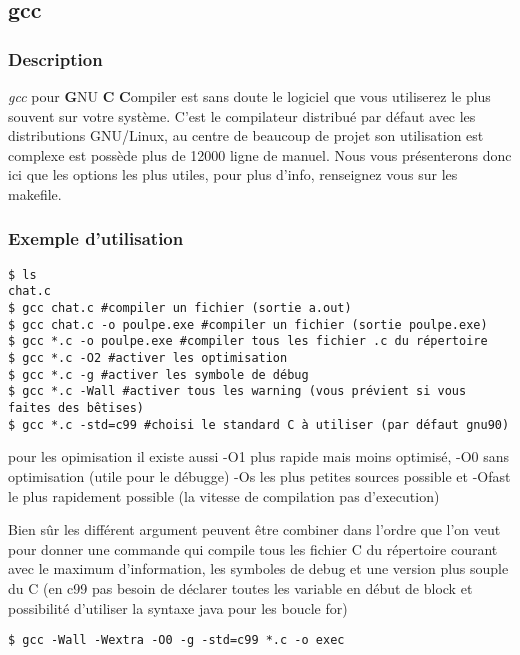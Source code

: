 \subsection*{gcc}
\subsubsection*{Description}
\emph{gcc} pour \textbf{G}NU \textbf{C} \textbf{C}ompiler est sans doute le logiciel que vous utiliserez le plus souvent sur votre système.
C'est le compilateur distribué par défaut avec les distributions GNU/Linux, au centre de beaucoup de projet son utilisation est complexe est possède plus de 12000 ligne de manuel.
Nous vous présenterons donc ici que les options les plus utiles,
pour plus d'info, renseignez vous sur les makefile.

\subsubsection*{Exemple d'utilisation}

\begin{lstlisting}
$ ls
chat.c
$ gcc chat.c #compiler un fichier (sortie a.out)
$ gcc chat.c -o poulpe.exe #compiler un fichier (sortie poulpe.exe)
$ gcc *.c -o poulpe.exe #compiler tous les fichier .c du répertoire
$ gcc *.c -O2 #activer les optimisation 
$ gcc *.c -g #activer les symbole de débug
$ gcc *.c -Wall #activer tous les warning (vous prévient si vous faites des bêtises)
$ gcc *.c -std=c99 #choisi le standard C à utiliser (par défaut gnu90)
\end{lstlisting}

pour les opimisation il existe aussi -O1 plus rapide mais moins optimisé, -O0 sans optimisation (utile pour le débugge)  -Os les plus petites sources possible et -Ofast le plus rapidement possible (la vitesse de compilation pas d'execution)

Bien sûr les différent argument peuvent être combiner dans l'ordre que l'on veut pour donner une commande qui compile tous les fichier C du répertoire courant avec le maximum d'information, les symboles de debug et une version plus souple du C (en c99 pas besoin de déclarer toutes les variable en début de block et possibilité d'utiliser la syntaxe java pour les boucle for)
\begin{lstlisting}
$ gcc -Wall -Wextra -O0 -g -std=c99 *.c -o exec
\end{lstlisting}
